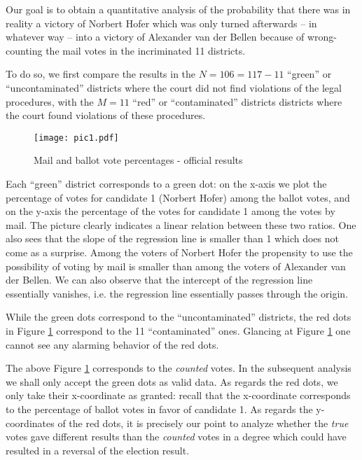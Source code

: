 \documentclass[12pt,a4paper]{article}
\theoremstyle{definition}
\begin{document}
Our goal is to obtain a quantitative analysis of the probability that there was in reality a victory of Norbert Hofer which was only turned afterwards -- in whatever way -- into a victory of Alexander van der Bellen because of wrong-counting the mail votes in the incriminated 11 districts. 

To do so, we first compare the results in the $N = 106 = 117-11$ ``green'' or ``uncontaminated'' districts where the court did not find violations of the legal procedures, with the $M = 11$ ``red'' or ``contaminated'' districts  districts where the court found violations of these procedures.



\begin{figure}[h]
  \texttt{[image: pic1.pdf]}
  \caption{Mail and ballot vote percentages - official results}
\label{figure:diag1}
\end{figure}


Each ``green'' district corresponds to a green dot: on the x-axis we plot the percentage of votes for candidate 1 (Norbert Hofer) among the ballot votes, and on the y-axis the percentage of the votes for candidate 1 among the votes by mail. The picture clearly indicates a linear relation between these two ratios. One also sees that the slope of the regression line is smaller than 1 which does not come as a surprise. Among the voters of Norbert Hofer the propensity to use the possibility of voting by mail is smaller than among the voters of Alexander van der Bellen. We can also observe that the intercept of the regression line essentially vanishes, i.e. the regression line essentially passes through the origin. 

While the green dots correspond to the ``uncontaminated'' districts, the red dots in Figure \ref{figure:diag1} correspond to the 11 ``contaminated'' ones. Glancing at Figure \ref{figure:diag1} one cannot see any alarming behavior of the red dots.

The above Figure \ref{figure:diag1} corresponds to the {\it counted} votes. In the subsequent analysis we shall only accept the green dots as valid data. As regards the red dots, we only take their x-coordinate as granted: recall that the x-coordinate corresponds to the percentage of ballot votes in favor of candidate 1. As regards the y-coordinates of the red dots, it is precisely our point to analyze whether the {\it true} votes gave different results than the {\it counted} votes in a degree which could have resulted in a reversal of the election result.
\end{document}
